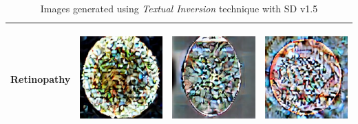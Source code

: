 \begin{table}[H]
\begin{tabularx}{\linewidth}{@{}>{\centering\arraybackslash}m{3cm}>{\centering\arraybackslash}X>{\centering\arraybackslash}X>{\centering\arraybackslash}X@{}}
Retinopathy & \includegraphics[valign=M,width=\linewidth,height=4cm,keepaspectratio]{main/content/images/sd_textual_inversion/retinopathy/ti1.jpeg} & \includegraphics[valign=M,width=\linewidth,height=4cm,keepaspectratio]{main/content/images/sd_textual_inversion/retinopathy/ti2.jpeg} & \includegraphics[valign=M,width=\linewidth,height=4cm,keepaspectratio]{main/content/images/sd_textual_inversion/retinopathy/ti3.jpeg} \\
\bottomrule
\end{tabularx}
\caption{Images generated using \textit{Textual Inversion} technique with SD v1.5}
\label{tab:image_comparison_textual_inversion}
\end{table}
